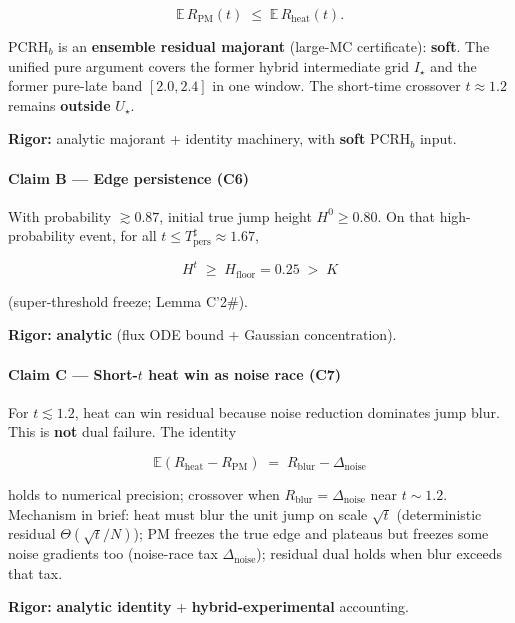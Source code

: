 \documentclass[
  11pt,
]{article}
\begin{document}
\[
\mathbb{E}\,R_{\mathrm{PM}}(t) \;\le\; \mathbb{E}\,R_{\mathrm{heat}}(t).
\]

PCRH\(_b\) is an \textbf{ensemble residual majorant} (large-MC certificate): \textbf{soft}. The unified pure argument covers the former hybrid intermediate grid \(I_\star\) and the former pure-late band \([2.0,2.4]\) in one window. The short-time crossover \(t\approx 1.2\) remains \textbf{outside} \(U_\star\).

\textbf{Rigor:} analytic majorant + identity machinery, with \textbf{soft} PCRH\(_b\) input.

\paragraph{\texorpdfstring{Claim B --- Edge persistence (\textbf{C6})}{Claim B --- Edge persistence (C6)}}\label{claim-b-edge-persistence-c6}

With probability \(\gtrsim 0.87\), initial true jump height \(H^0\ge 0.80\). On that high-probability event, for all \(t\le T_{\mathrm{pers}}^\sharp\approx 1.67\),

\[
H^t \;\ge\; H_{\mathrm{floor}}=0.25 \;>\; K
\]

(super-threshold freeze; Lemma C'2\#).

\textbf{Rigor:} \textbf{analytic} (flux ODE bound + Gaussian concentration).

\paragraph{\texorpdfstring{Claim C --- Short-\(t\) heat win as noise race (\textbf{C7})}{Claim C --- Short-t heat win as noise race (C7)}}\label{claim-c-short-t-heat-win-as-noise-race-c7}

For \(t\lesssim 1.2\), heat can win residual because noise reduction dominates jump blur. This is \textbf{not} dual failure. The identity

\[
\mathbb{E}(R_{\mathrm{heat}}-R_{\mathrm{PM}}) \;=\; R_{\mathrm{blur}}-\Delta_{\mathrm{noise}}
\]

holds to numerical precision; crossover when \(R_{\mathrm{blur}}=\Delta_{\mathrm{noise}}\) near \(t\sim 1.2\). Mechanism in brief: heat must blur the unit jump on scale \(\sqrt{t}\) (deterministic residual \(\Theta(\sqrt{t}/N)\)); PM freezes the true edge and plateaus but freezes some noise gradients too (noise-race tax \(\Delta_{\mathrm{noise}}\)); residual dual holds when blur exceeds that tax.

\textbf{Rigor:} \textbf{analytic identity} + \textbf{hybrid-experimental} accounting.
\end{document}
